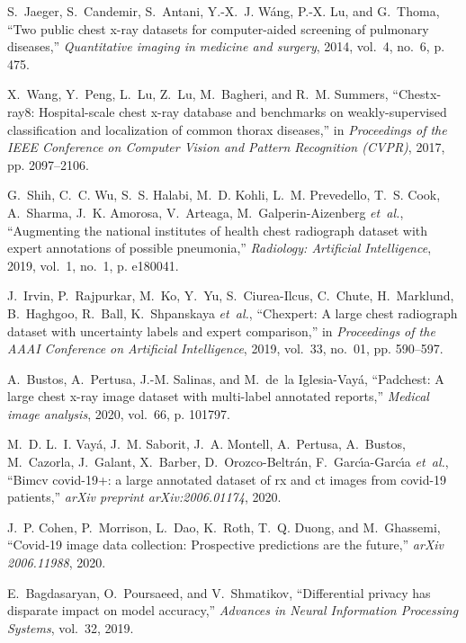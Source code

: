 \documentclass[journal]{IEEEtran}
\begin{document}
\begin{thebibliography}{100}
S.~Jaeger, S.~Candemir, S.~Antani, Y.-X.~J. W{\'a}ng, P.-X. Lu, and G.~Thoma, ``Two public chest x-ray datasets for computer-aided screening of pulmonary diseases,'' \emph{Quantitative imaging in medicine and surgery}, 2014, vol.~4, no.~6, p. 475.

X.~Wang, Y.~Peng, L.~Lu, Z.~Lu, M.~Bagheri, and R.~M. Summers, ``Chestx-ray8: Hospital-scale chest x-ray database and benchmarks on weakly-supervised classification and localization of common thorax diseases,'' in
\emph{Proceedings of the IEEE Conference on Computer Vision and Pattern Recognition (CVPR)}, 2017, pp. 2097--2106.

G.~Shih, C.~C. Wu, S.~S. Halabi, M.~D. Kohli, L.~M. Prevedello, T.~S. Cook,
A.~Sharma, J.~K. Amorosa, V.~Arteaga, M.~Galperin-Aizenberg \emph{et~al.},
``Augmenting the national institutes of health chest radiograph dataset with
expert annotations of possible pneumonia,'' \emph{Radiology: Artificial
Intelligence}, 2019, vol.~1, no.~1, p. e180041.

J.~Irvin, P.~Rajpurkar, M.~Ko, Y.~Yu, S.~Ciurea-Ilcus, C.~Chute, H.~Marklund,
B.~Haghgoo, R.~Ball, K.~Shpanskaya \emph{et~al.}, ``Chexpert: A large chest
radiograph dataset with uncertainty labels and expert comparison,'' in
\emph{Proceedings of the AAAI Conference on Artificial Intelligence}, 2019, vol.~33,
no.~01, pp. 590--597.

A.~Bustos, A.~Pertusa, J.-M. Salinas, and M.~de~la Iglesia-Vay{\'a},
``Padchest: A large chest x-ray image dataset with multi-label annotated
reports,'' \emph{Medical image analysis}, 2020, vol.~66, p. 101797.

M.~D. L.~I. Vay{\'a}, J.~M. Saborit, J.~A. Montell, A.~Pertusa, A.~Bustos,
M.~Cazorla, J.~Galant, X.~Barber, D.~Orozco-Beltr{\'a}n,
F.~Garc{\'\i}a-Garc{\'\i}a \emph{et~al.}, ``Bimcv covid-19+: a large
annotated dataset of rx and ct images from covid-19 patients,'' \emph{arXiv
preprint arXiv:2006.01174}, 2020.

J.~P. Cohen, P.~Morrison, L.~Dao, K.~Roth, T.~Q. Duong, and M.~Ghassemi,
``Covid-19 image data collection: Prospective predictions are the future,''
\emph{arXiv 2006.11988}, 2020.

E.~Bagdasaryan, O.~Poursaeed, and V.~Shmatikov, ``Differential privacy has
disparate impact on model accuracy,'' \emph{Advances in Neural Information Processing Systems}, vol.~32, 2019.


\end{thebibliography}
\end{document}
